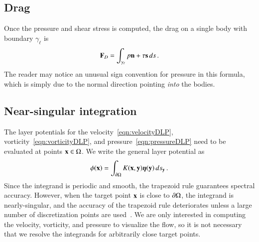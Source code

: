 \documentclass[preprint, 10pt]{elsarticle}
\begin{document}
\subsection{Drag}
\label{sec:drag}
Once the pressure and shear stress is computed, the drag on a single body with boundary $\gamma_\ell$ is
\begin{align}
\mathbf{F}_{D} = \int_{\gamma_\ell} p {\mathbf{n}} + \tau {\mathbf{s}} \,ds\, .
\label{eqn:drag}
\end{align}
The reader may notice an unusual sign convention for pressure in this formula, which is simply due to the normal direction pointing {\em into} the bodies.

\subsection{Near-singular integration}
\label{sec:NSI}
The layer potentials for the velocity~\eqref{eqn:velocityDLP}, vorticity~\eqref{eqn:vorticityDLP}, and pressure~\eqref{eqn:pressureDLP} need to be evaluated at points ${\mathbf{x}} \in \Omega$. We write the general layer potential as
\begin{align}
  \phi({\mathbf{x}}) = \int_{{\partial}\Omega} K({\mathbf{x}},{\mathbf{y}}) {\boldsymbol\eta}({\mathbf{y}}) \, ds_{\mathbf{y}}\, .
  \label{eqn:genericLP}
\end{align}
Since the integrand is periodic and smooth, the trapezoid rule guarantees spectral accuracy.  However, when the target point ${\mathbf{x}}$ is close to ${\partial}\Omega$, the integrand is nearly-singular, and the accuracy of the trapezoid rule deteriorates unless a large number of discretization points are used~\cite{bar2014}.  We are only interested in computing the velocity, vorticity, and pressure to visualize the flow, so it is not necessary that we resolve the integrands for arbitrarily close target points.
\end{document}
